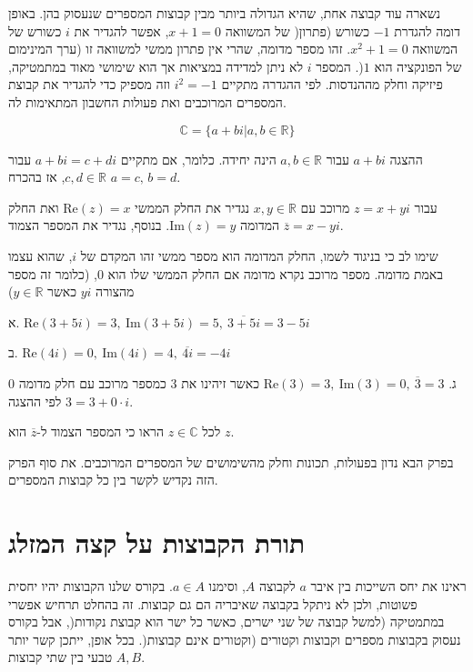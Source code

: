\documentclass[
  hebrew,
  12pt,
  a4paper,
  oneside]{book}
\theoremstyle{definition}
\theoremstyle{remark}
\theoremstyle{plain}
\theoremstyle{remark}
\begin{document}
נשארה עוד קבוצה אחת, שהיא הגדולה ביותר מבין קבוצות המספרים שנעסוק בהן.
באופן דומה להגדרת \(-1\) כשורש (פתרון( של המשוואה \(x+1=0\), אפשר להגדיר
את \(i\) כשורש של המשוואה \(x^{2}+1=0\). זהו מספר מדומה, שהרי אין פתרון
ממשי למשוואה זו (ערך המינימום של הפונקציה הוא \(1\)(. המספר \(i\) לא
ניתן למדידה במציאות אך הוא שימושי מאוד במתמטיקה, פיזיקה וחלק מההנדסות.
לפי ההגדרה מתקיים \(i^{2}=-1\) וזה מספיק כדי להגדיר את קבוצת המספרים
המרוכבים ואת פעולות החשבון המתאימות לה.

\[\mathbb{\mathbb{C}}=\{a+bi|a,b\in\mathbb{R}\}\]

ההצגה \(a+bi\) עבור \(a,b\in\mathbb{R}\) הינה יחידה. כלומר, אם מתקיים
\(a+bi=c+di\) עבור \(c,d\in\mathbb{R}\), אז בהכרח \(a=c,\,b=d\).

עבור \(z=x+yi\) מרוכב עם \(x,y\in\mathbb{R}\) נגדיר את החלק הממשי
\(\text{{Re}}(z)=x\) ואת החלק המדומה \(\text{{Im}}(z)=y\). בנוסף, נגדיר
את המספר הצמוד \(\overline{z}=x-yi\).

שימו לב כי בניגוד לשמו, החלק המדומה הוא מספר ממשי זהו המקדם של \(i\),
שהוא עצמו באמת מדומה. מספר מרוכב נקרא מדומה אם החלק הממשי שלו הוא \(0\),
(כלומר זה מספר מהצורה \(yi\) כאשר \(y\in\mathbb{R}\))

א. \(\text{{Re}}(3+5i)=3,\:\text{{Im}}(3+5i)=5,\:\overline{3+5i}=3-5i\)

ב. \(\text{{Re}}(4i)=0,\:\text{{Im}}(4i)=4,\:\overline{4i}=-4i\)

ג. \(\text{{Re}}(3)=3,\:\text{{Im}}(3)=0,\:\overline{3}=3\) כאשר זיהינו
את \(3\) כמספר מרוכב עם חלק מדומה \(0\) לפי ההצגה \(3=3+0\cdot i\).

\begin{exercise}

לכל \(z\in\mathbb{C}\) הראו כי המספר הצמוד ל-\(\overline{z}\) הוא \(z\).

\end{exercise}

בפרק הבא נדון בפעולות, תכונות וחלק מהשימושים של המספרים המרוכבים. את סוף
הפרק הזה נקדיש לקשר בין כל קבוצות המספרים.

\section{תורת הקבוצות על קצה
המזלג}\label{ux5eaux5d5ux5e8ux5ea-ux5d4ux5e7ux5d1ux5d5ux5e6ux5d5ux5ea-ux5e2ux5dc-ux5e7ux5e6ux5d4-ux5d4ux5deux5d6ux5dcux5d2}

ראינו את יחס השייכות בין איבר \(a\) לקבוצה \(A\), וסימנו \(a\in A\).
בקורס שלנו הקבוצות יהיו יחסית פשוטות, ולכן לא ניתקל בקבוצה שאיבריה הם גם
קבוצות. זה בהחלט תרחיש אפשרי במתמטיקה (למשל קבוצה של שני ישרים, כאשר כל
ישר הוא קבוצת נקודות(, אבל בקורס נעסוק בקבוצות מספרים וקבוצות וקטורים
(וקטורים אינם קבוצות(. בכל אופן, ייתכן קשר יותר טבעי בין שתי קבוצות
\(A,B\).
\end{document}
